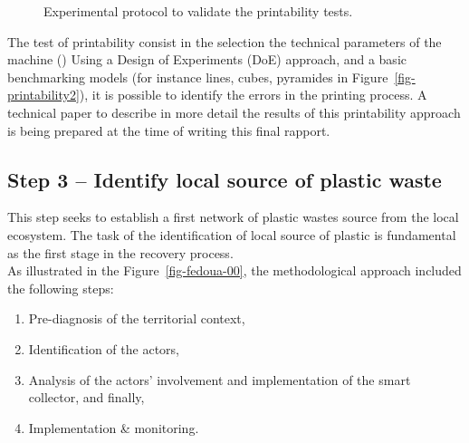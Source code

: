 \documentclass[
  11pt,
]{article}
\providecommand{\tightlist}{%
  \setlength{\itemsep}{0pt}\setlength{\parskip}{0pt}}\usepackage{longtable,booktabs,array}
\begin{document}
\begin{figure}
\begin{minipage}[t]{\linewidth}
{{}

}

\end{minipage}%

\caption{\label{fig-printability}Experimental protocol to validate the
printability tests.}

\end{figure}

The test of printability consist in the selection the technical
parameters of the machine () Using a Design of Experiments (DoE)
approach, and a basic benchmarking models (for instance lines, cubes,
pyramides in Figure~\ref{fig-printability2}), it is possible to identify
the errors in the printing process. A technical paper to describe in
more detail the results of this printability approach is being prepared
at the time of writing this final rapport.

\hypertarget{step-3-identify-local-source-of-plastic-waste}{%
\subsection{Step 3 -- Identify local source of plastic
waste}\label{step-3-identify-local-source-of-plastic-waste}}

This step seeks to establish a first network of plastic wastes source
from the local ecosystem. The task of the identification of local source
of plastic is fundamental as the first stage in the recovery process.\\
As illustrated in the Figure~\ref{fig-fedoua-00}, the methodological
approach included the following steps:

\begin{enumerate}
\def\labelenumi{\arabic{enumi}.}
\tightlist
\item
  Pre-diagnosis of the territorial context,
\item
  Identification of the actors,
\item
  Analysis of the actors' involvement and implementation of the smart
  collector, and finally,
\item
  Implementation \& monitoring.
\end{enumerate}
\end{document}
